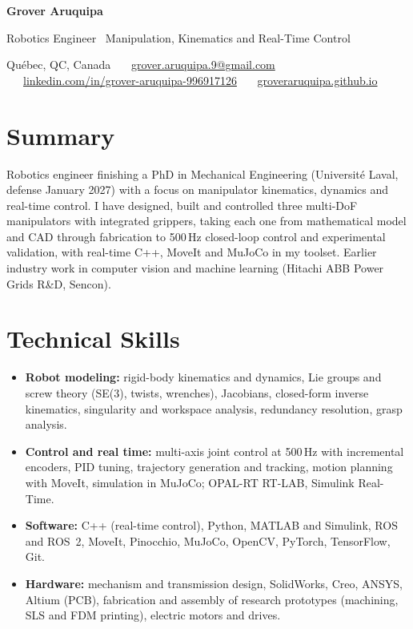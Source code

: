 \documentclass[10pt,letterpaper]{article}
\begin{document}
{\LARGE\bfseries Grover Aruquipa}\par\vspace{2pt}
{\large Robotics Engineer \textbar\ Manipulation, Kinematics and Real-Time Control}\par\vspace{3pt}
{\small Qu\'ebec, QC, Canada \ \textbullet\ \
\href{mailto:grover.aruquipa.9@gmail.com}{grover.aruquipa.9@gmail.com} \ \textbullet\ \
\href{https://www.linkedin.com/in/grover-aruquipa-996917126}{linkedin.com/in/grover-aruquipa-996917126} \ \textbullet\ \
\href{https://groveraruquipa.github.io}{groveraruquipa.github.io}}\par

\section{Summary}
Robotics engineer finishing a PhD in Mechanical Engineering (Universit\'e Laval, defense January 2027) with a focus on
manipulator kinematics, dynamics and real-time control. I have designed, built and controlled three multi-DoF
manipulators with integrated grippers, taking each one from mathematical model and CAD through fabrication to 500\,Hz
closed-loop control and experimental validation, with real-time C++, MoveIt and MuJoCo in my toolset. Earlier industry work in computer vision and machine learning
(Hitachi ABB Power Grids R\&D, Sencon).

\section{Technical Skills}
\begin{itemize}
\item \textbf{Robot modeling:} rigid-body kinematics and dynamics, Lie groups and screw theory (SE(3), twists, wrenches),
Jacobians, closed-form inverse kinematics, singularity and workspace analysis, redundancy resolution, grasp analysis.
\item \textbf{Control and real time:} multi-axis joint control at 500\,Hz with incremental encoders, PID tuning,
trajectory generation and tracking, motion planning with MoveIt, simulation in MuJoCo; OPAL-RT RT-LAB,
Simulink Real-Time.
\item \textbf{Software:} C++ (real-time control), Python, MATLAB and Simulink, ROS and ROS~2, MoveIt, Pinocchio,
MuJoCo, OpenCV, PyTorch, TensorFlow, Git.
\item \textbf{Hardware:} mechanism and transmission design, SolidWorks, Creo, ANSYS, Altium (PCB), fabrication and
assembly of research prototypes (machining, SLS and FDM printing), electric motors and drives.
\end{itemize}
\end{document}
